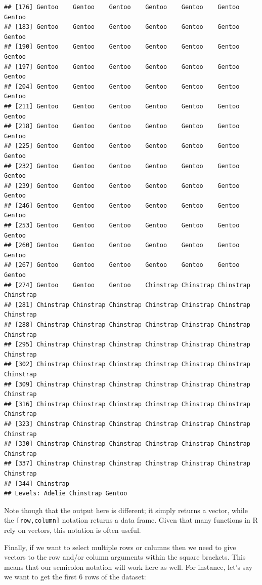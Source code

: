 \documentclass[
]{book}
\begin{document}
\begin{verbatim}
## [176] Gentoo    Gentoo    Gentoo    Gentoo    Gentoo    Gentoo    Gentoo   
## [183] Gentoo    Gentoo    Gentoo    Gentoo    Gentoo    Gentoo    Gentoo   
## [190] Gentoo    Gentoo    Gentoo    Gentoo    Gentoo    Gentoo    Gentoo   
## [197] Gentoo    Gentoo    Gentoo    Gentoo    Gentoo    Gentoo    Gentoo   
## [204] Gentoo    Gentoo    Gentoo    Gentoo    Gentoo    Gentoo    Gentoo   
## [211] Gentoo    Gentoo    Gentoo    Gentoo    Gentoo    Gentoo    Gentoo   
## [218] Gentoo    Gentoo    Gentoo    Gentoo    Gentoo    Gentoo    Gentoo   
## [225] Gentoo    Gentoo    Gentoo    Gentoo    Gentoo    Gentoo    Gentoo   
## [232] Gentoo    Gentoo    Gentoo    Gentoo    Gentoo    Gentoo    Gentoo   
## [239] Gentoo    Gentoo    Gentoo    Gentoo    Gentoo    Gentoo    Gentoo   
## [246] Gentoo    Gentoo    Gentoo    Gentoo    Gentoo    Gentoo    Gentoo   
## [253] Gentoo    Gentoo    Gentoo    Gentoo    Gentoo    Gentoo    Gentoo   
## [260] Gentoo    Gentoo    Gentoo    Gentoo    Gentoo    Gentoo    Gentoo   
## [267] Gentoo    Gentoo    Gentoo    Gentoo    Gentoo    Gentoo    Gentoo   
## [274] Gentoo    Gentoo    Gentoo    Chinstrap Chinstrap Chinstrap Chinstrap
## [281] Chinstrap Chinstrap Chinstrap Chinstrap Chinstrap Chinstrap Chinstrap
## [288] Chinstrap Chinstrap Chinstrap Chinstrap Chinstrap Chinstrap Chinstrap
## [295] Chinstrap Chinstrap Chinstrap Chinstrap Chinstrap Chinstrap Chinstrap
## [302] Chinstrap Chinstrap Chinstrap Chinstrap Chinstrap Chinstrap Chinstrap
## [309] Chinstrap Chinstrap Chinstrap Chinstrap Chinstrap Chinstrap Chinstrap
## [316] Chinstrap Chinstrap Chinstrap Chinstrap Chinstrap Chinstrap Chinstrap
## [323] Chinstrap Chinstrap Chinstrap Chinstrap Chinstrap Chinstrap Chinstrap
## [330] Chinstrap Chinstrap Chinstrap Chinstrap Chinstrap Chinstrap Chinstrap
## [337] Chinstrap Chinstrap Chinstrap Chinstrap Chinstrap Chinstrap Chinstrap
## [344] Chinstrap
## Levels: Adelie Chinstrap Gentoo
\end{verbatim}

Note though that the output here is different; it simply returns a vector, while the \texttt{{[}row,column{]}} notation returns a data frame. Given that many functions in R rely on vectors, this notation is often useful.

Finally, if we want to select multiple rows or columns then we need to give vectors to the row and/or column arguments within the square brackets. This means that our semicolon notation will work here as well. For instance, let's say we want to get the first 6 rows of the dataset:
\end{document}
